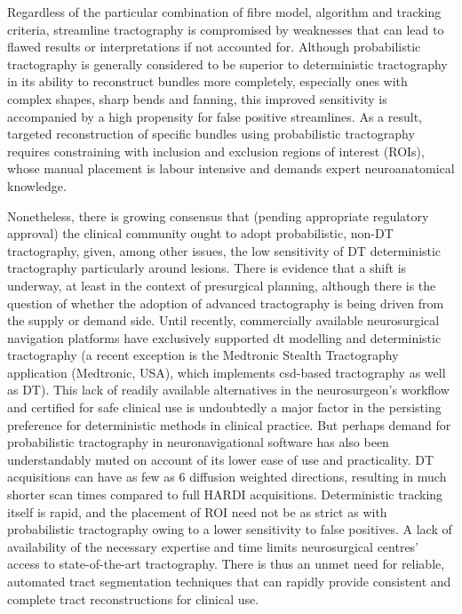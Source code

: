 Regardless of the particular combination of fibre model, algorithm and tracking criteria, streamline tractography is compromised by weaknesses that can lead to flawed results or interpretations if not accounted for.\autocite{Rheault2020, Schilling2022, Schilling2019}
Although probabilistic tractography is generally considered to be superior to deterministic tractography in its ability to reconstruct bundles more completely, especially ones with complex shapes, sharp bends and fanning, this improved sensitivity is accompanied by a high propensity for false positive streamlines.\autocite{Maier-Hein2017}
As a result, targeted reconstruction of specific bundles using probabilistic tractography requires constraining with inclusion and exclusion regions of interest (ROIs), whose manual placement is labour intensive and demands expert neuroanatomical knowledge.

Nonetheless, there is growing consensus that (pending appropriate regulatory approval) the clinical community ought to adopt probabilistic, non-DT tractography,\autocite{Yang2021, Beare2022, Petersen2017} given, among other issues, the low sensitivity of DT deterministic tractography particularly around lesions.\autocite{Ashmore2020}
There is evidence that a shift is underway, at least in the context of presurgical planning,\autocite{Toescu2020} although there is the question of whether the adoption of advanced tractography is being driven from the supply or demand side.
Until recently, commercially available neurosurgical navigation platforms have exclusively supported \gls{dt} modelling and deterministic tractography (a recent exception is the Medtronic Stealth\texttrademark{}  Tractography application (Medtronic, USA), which implements \gls{csd}-based tractography\autocite{Pozzilli2023} as well as DT).
This lack of readily available alternatives in the neurosurgeon's workflow and certified for safe clinical use is undoubtedly a major factor in the persisting preference for deterministic methods in clinical practice.
But perhaps demand for probabilistic tractography in neuronavigational software has also been understandably muted on account of its lower ease of use and practicality.
DT acquisitions can have as few as 6 diffusion weighted directions, resulting in much shorter scan times compared to full HARDI acquisitions.
Deterministic tracking itself is rapid, and the placement of ROI need not be as strict as with probabilistic tractography owing to a lower sensitivity to false positives.\autocite{ODonnell2017}
A lack of availability of the necessary expertise and time limits neurosurgical centres' access to state-of-the-art tractography.\autocite{Toescu2020}
There is thus an unmet need for reliable, automated tract segmentation techniques that can rapidly provide consistent and complete tract reconstructions for clinical use.

